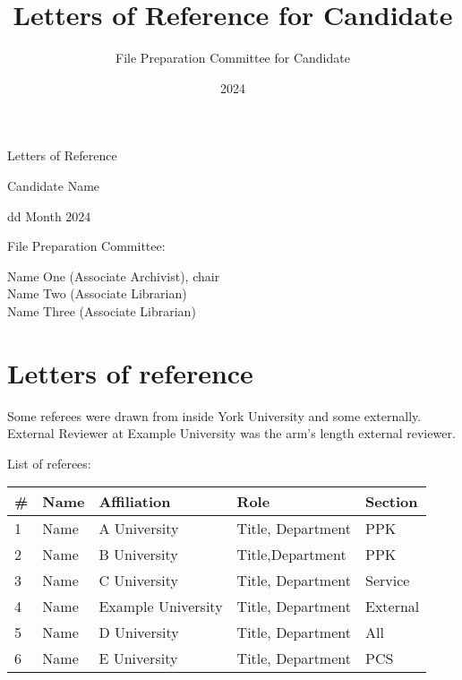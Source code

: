 \documentclass[12pt,oneside]{book}
\title{Letters of Reference for Candidate}
\author{File Preparation Committee for Candidate}
\date{2024}
\begin{document}
\begin{titlepage}

  \null\vfill

  \begin{center}

    {\Huge Letters of Reference }
    \vspace{2cm}

    {\Large Candidate Name }
    \vspace{1cm}

    {\large dd Month 2024 }

\end{center}

\vfill
\vfill

{\large
  File Preparation Committee:

  Name One (Associate Archivist), chair \\
  \indent Name Two (Associate Librarian) \\
  \indent Name Three (Associate Librarian)

}

\hfill

\end{titlepage}

\tableofcontents
\markboth{}{}

\chapter{Letters of reference}

Some referees were drawn from inside York University and some externally.  External Reviewer at Example University was the arm's length external reviewer.

\vspace{3cm}

List of referees:

\vspace{1cm}

\begin{tabular}{ll >{\raggedright}p{4cm} >{\raggedright}p{6cm} l}

  \# & Name & Affiliation & Role & Section \\
  \toprule
  1 & Name & A University & Title, Department & PPK \\
  2 & Name & B University & Title,Department & PPK \\
  3 & Name & C University & Title, Department & Service \\
  4 & Name & Example University & Title, Department & External \\
  5 & Name & D University & Title, Department & All \\
  6 & Name & E University & Title, Department & PCS

  \end{tabular}
\end{document}
